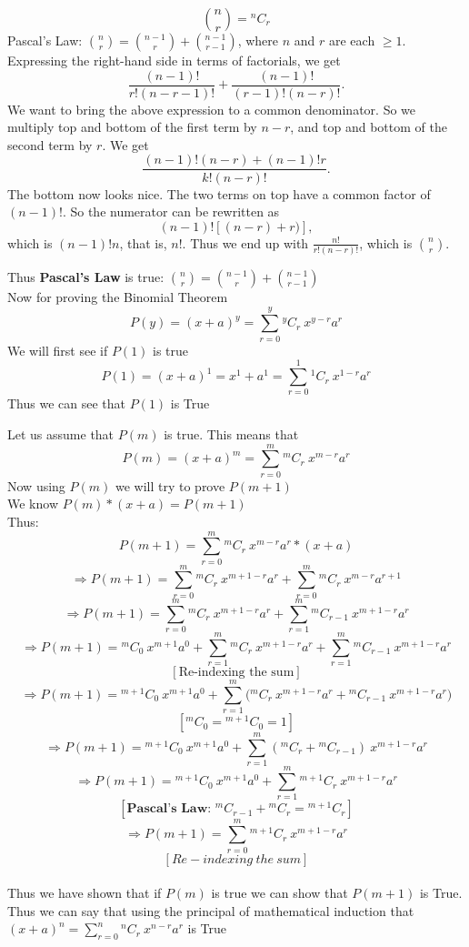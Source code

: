 \documentclass[10pt]{article}
\newenvironment{solution}[2][Solution]{ \begin{trivlist}
\item[\hskip \labelsep {\bfseries #1}]}{\end{trivlist}}
\begin{document}
\begin{solution}{2}
\item[]
$$\binom{n}{r} = {^{n}C_{r}}$$
Pascal's Law: $\binom{n}{r}=\binom{n-1}{r}+\binom{n-1}{r-1}$, where $n$ and $r$ are each $\ge 1$. Expressing the right-hand side in terms of factorials, we get
$$\frac{(n-1)!}{r!(n-r-1)!}+\frac{(n-1)!}{(r-1)!(n-r)!}.$$
We want to bring the above expression to a common denominator. So we multiply top and bottom of the first term by $n-r$, and top and bottom of the second term by $r$. We get
$$\frac{(n-1)!(n-r)+(n-1)!r}{k!(n-r)!}.$$
The bottom now looks nice. The two terms on top have a common factor of $(n-1)!$. So the numerator can be rewritten as
$$(n-1)![(n-r)+r)],$$
which is $(n-1)!n$, that is, $n!$. Thus we end up with $\frac{n!}{r!(n-r)!}$, which is $\binom{n}{r}$.

Thus \textbf{Pascal's Law} is true: $\binom{n}{r}=\binom{n-1}{r}+\binom{n-1}{r-1}$\\
Now for proving the Binomial Theorem
\[
P(y) = (x+a)^y = \sum_{r=0}^y{^{y}C_{r}}\ x^{y-r}a^r\]
We will first see if $P(1)$ is true
\[
P(1) = (x+a)^1 = x^1 + a^1 = \sum_{r=0}^1{^{1}C_{r}}\ x^{1-r}a^r
\]
Thus we can see that $P(1)$ is True

Let us assume that $P(m)$ is true. This means that
\[P(m)  = (x+a)^m = \sum_{r=0}^m{^{m}C_{r}}\ x^{m-r}a^r
\]
Now using $P(m)$ we will try to prove $P(m+1)$\\
We know $P(m) * (x+a) = P(m+1)$\\
Thus: \[P(m+1) = {\sum_{r=0}^m{^{m}C_{r}}\ x^{m-r}a^r } * (x+a) \]
\[\Rightarrow P(m+1) = {\sum_{r=0}^m{^{m}C_{r}}\ x^{m+1-r}a^r } + {\sum_{r=0}^m{^{m}C_{r}}\ x^{m-r}a^{r+1} } \]
\[\Rightarrow P(m+1) = {\sum_{r=0}^m{^{m}C_{r}}\ x^{m+1-r}a^r } + {\sum_{r=1}^m{^{m}C_{r-1}}\ x^{m+1-r}a^{r} } \]
\[\Rightarrow P(m+1) = {{^{m}C_{0}}\ x^{m+1}a^0}+  {\sum_{r=1}^m{^{m}C_{r}}\ x^{m+1-r}a^r } + {\sum_{r=1}^m{^{m}C_{r-1}}\ x^{m+1-r}a^{r} }\]
$$[\text{Re-indexing the sum}]$$
\[\Rightarrow P(m+1) = {{^{m+1}C_{0}}\ x^{m+1}a^0}+  {\sum_{r=1}^m({^{m}C_{r}}\ x^{m+1-r}a^r + {^{m}C_{r-1}}\ x^{m+1-r}a^{r}}) \]
$$[{^{m}C_{0}} = {^{m+1}C_{0}} = 1]$$
\[\Rightarrow P(m+1) = {{^{m+1}C_{0}}\ x^{m+1}a^0}+  {\sum_{r=1}^m({^{m}C_{r}}+ {^{m}C_{r-1}})\ x^{m+1-r}a^r} \]
\[\Rightarrow P(m+1) = {{^{m+1}C_{0}}\ x^{m+1}a^0}+  {\sum_{r=1}^m{^{m+1}C_{r}}\ x^{m+1-r}a^r} \]
$$[\textbf{Pascal's Law: }{^{m}C_{r-1}} + {^{m}C_{r}} = {^{m+1}C_{r}}]$$
\[\Rightarrow P(m+1) = {\sum_{r=0}^m{^{m+1}C_{r}}\ x^{m+1-r}a^r} \]
$$[Re-indexing\ the\ sum]$$\\

Thus we have shown that if $P(m)$ is true we can show that $P(m+1)$ is True. \\

Thus we can say that using the principal of mathematical induction that $
(x+a)^n = \sum_{r=0}^n{^{n}C_{r}}\ x^{n-r}a^r
$ is True


\end{solution}
\end{document}
